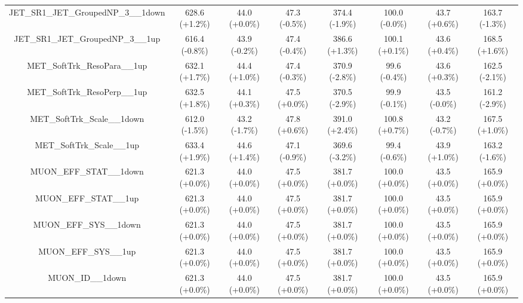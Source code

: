 \begin{table}[htbp!]
\begin{tiny}
\begin{center}
\begin{tabular}{c|c|c|c||c|c|c|c}
JET\_SR1\_JET\_GroupedNP\_3\_\_1down                         & 628.6     (+1.2\%) & 44.0      (+0.0\%) & 47.3      (-0.5\%) & 374.4     (-1.9\%) & 100.0     (-0.0\%) & 43.7      (+0.6\%) & 163.7     (-1.3\%) \\ 
JET\_SR1\_JET\_GroupedNP\_3\_\_1up                           & 616.4     (-0.8\%) & 43.9      (-0.2\%) & 47.4      (-0.4\%) & 386.6     (+1.3\%) & 100.1     (+0.1\%) & 43.6      (+0.4\%) & 168.5     (+1.6\%) \\ 
MET\_SoftTrk\_ResoPara\_\_1up                                & 632.1     (+1.7\%) & 44.4      (+1.0\%) & 47.4      (-0.3\%) & 370.9     (-2.8\%) & 99.6      (-0.4\%) & 43.6      (+0.3\%) & 162.5     (-2.1\%) \\ 
MET\_SoftTrk\_ResoPerp\_\_1up                                & 632.5     (+1.8\%) & 44.1      (+0.3\%) & 47.5      (+0.0\%) & 370.5     (-2.9\%) & 99.9      (-0.1\%) & 43.5      (-0.0\%) & 161.2     (-2.9\%) \\ 
MET\_SoftTrk\_Scale\_\_1down                                 & 612.0     (-1.5\%) & 43.2      (-1.7\%) & 47.8      (+0.6\%) & 391.0     (+2.4\%) & 100.8     (+0.7\%) & 43.2      (-0.7\%) & 167.5     (+1.0\%) \\ 
MET\_SoftTrk\_Scale\_\_1up                                   & 633.4     (+1.9\%) & 44.6      (+1.4\%) & 47.1      (-0.9\%) & 369.6     (-3.2\%) & 99.4      (-0.6\%) & 43.9      (+1.0\%) & 163.2     (-1.6\%) \\ 
MUON\_EFF\_STAT\_\_1down                                     & 621.3     (+0.0\%) & 44.0      (+0.0\%) & 47.5      (+0.0\%) & 381.7     (+0.0\%) & 100.0     (+0.0\%) & 43.5      (+0.0\%) & 165.9     (+0.0\%) \\ 
MUON\_EFF\_STAT\_\_1up                                       & 621.3     (+0.0\%) & 44.0      (+0.0\%) & 47.5      (+0.0\%) & 381.7     (+0.0\%) & 100.0     (+0.0\%) & 43.5      (+0.0\%) & 165.9     (+0.0\%) \\ 
MUON\_EFF\_SYS\_\_1down                                      & 621.3     (+0.0\%) & 44.0      (+0.0\%) & 47.5      (+0.0\%) & 381.7     (+0.0\%) & 100.0     (+0.0\%) & 43.5      (+0.0\%) & 165.9     (+0.0\%) \\ 
MUON\_EFF\_SYS\_\_1up                                        & 621.3     (+0.0\%) & 44.0      (+0.0\%) & 47.5      (+0.0\%) & 381.7     (+0.0\%) & 100.0     (+0.0\%) & 43.5      (+0.0\%) & 165.9     (+0.0\%) \\ 
MUON\_ID\_\_1down                                            & 621.3     (+0.0\%) & 44.0      (+0.0\%) & 47.5      (+0.0\%) & 381.7     (+0.0\%) & 100.0     (+0.0\%) & 43.5      (+0.0\%) & 165.9     (+0.0\%) \\ 

\end{tabular}
\end{center}
\end{tiny}
\end{table}
